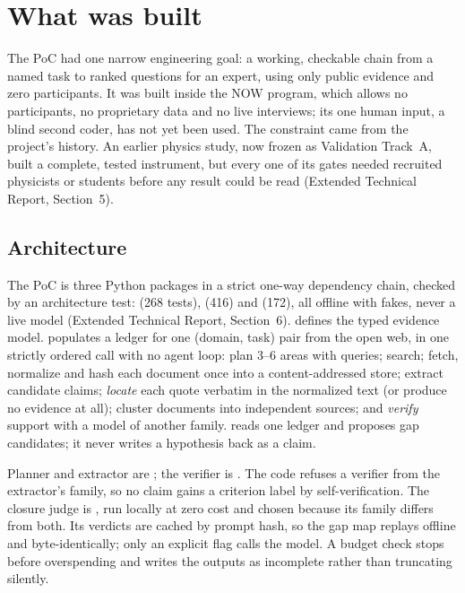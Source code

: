 \section{What was built}\label{sec:built}

The PoC had one narrow engineering goal: a working, checkable chain from a named task to ranked
questions for an expert, using only public evidence and zero participants. It was built inside the
NOW program, which allows no participants, no proprietary data and no live interviews; its one human
input, a blind second coder, has not yet been used. \evint{} The constraint came from the project's
history. An earlier physics study, now frozen as Validation Track~A, built a complete, tested
instrument, but every one of its gates needed recruited physicists or students before any result
could be read (Extended Technical Report, Section~5).

\subsection{Architecture}

\evobs{} The PoC is three Python packages in a strict one-way dependency chain, checked by an
architecture test:  (268 tests),  (416) and  (172),
all offline with fakes, never a live model (Extended Technical Report, Section~6).
 defines the typed evidence model.
 populates a ledger for one (domain, task) pair from the open web, in one
strictly ordered call with no agent loop: plan 3--6 areas with queries; search; fetch, normalize and
hash each document once into a content-addressed store; extract candidate claims; \emph{locate} each
quote verbatim in the normalized text (or produce no evidence at all); cluster documents into
independent sources; and \emph{verify} support with a model of another family.  reads
one ledger and proposes gap candidates; it never writes a hypothesis back as a claim.


\evobs{} Planner and extractor are ; the verifier is
. The code refuses a verifier from the extractor's family, so no claim gains
a criterion label by self-verification. The closure judge is , run locally
at zero cost and chosen because its family differs from both. Its verdicts are cached by prompt hash,
so the gap map replays offline and byte-identically; only an explicit flag calls the model. A budget
check stops before overspending and writes the outputs as incomplete rather than truncating silently.

